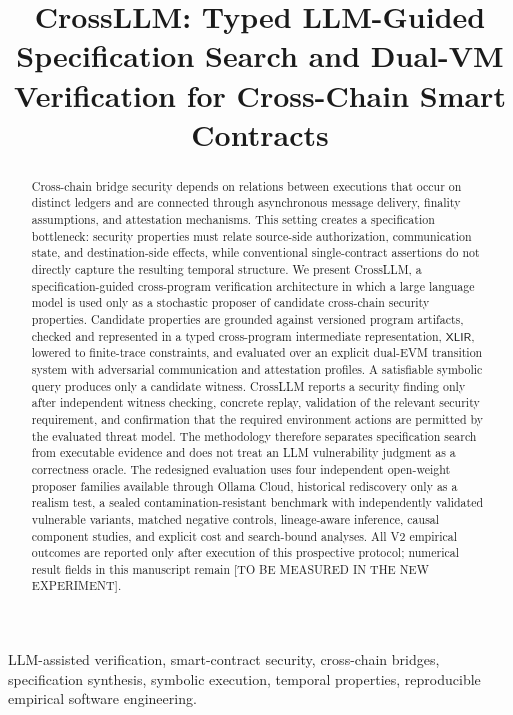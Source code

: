 \documentclass[journal]{IEEEtran}
\title{CrossLLM: Typed LLM-Guided Specification Search and Dual-VM Verification for Cross-Chain Smart Contracts}
\theoremstyle{definition}
\newcommand{\xlir}{\ensuremath{\mathsf{XLIR}}}
\newcommand{\CrossTBD}{\textnormal{[TO BE MEASURED IN THE NEW EXPERIMENT]}}
\begin{document}
\maketitle

\begin{abstract}
Cross-chain bridge security depends on relations between executions that occur on distinct ledgers and are connected through asynchronous message delivery, finality assumptions, and attestation mechanisms. This setting creates a specification bottleneck: security properties must relate source-side authorization, communication state, and destination-side effects, while conventional single-contract assertions do not directly capture the resulting temporal structure. We present CrossLLM, a specification-guided cross-program verification architecture in which a large language model is used only as a stochastic proposer of candidate cross-chain security properties. Candidate properties are grounded against versioned program artifacts, checked and represented in a typed cross-program intermediate representation, \xlir, lowered to finite-trace constraints, and evaluated over an explicit dual-EVM transition system with adversarial communication and attestation profiles. A satisfiable symbolic query produces only a candidate witness. CrossLLM reports a security finding only after independent witness checking, concrete replay, validation of the relevant security requirement, and confirmation that the required environment actions are permitted by the evaluated threat model. The methodology therefore separates specification search from executable evidence and does not treat an LLM vulnerability judgment as a correctness oracle. The redesigned evaluation uses four independent open-weight proposer families available through Ollama Cloud, historical rediscovery only as a realism test, a sealed contamination-resistant benchmark with independently validated vulnerable variants, matched negative controls, lineage-aware inference, causal component studies, and explicit cost and search-bound analyses. All V2 empirical outcomes are reported only after execution of this prospective protocol; numerical result fields in this manuscript remain \CrossTBD.
\end{abstract}

\begin{IEEEkeywords}
LLM-assisted verification, smart-contract security, cross-chain bridges, specification synthesis, symbolic execution, temporal properties, reproducible empirical software engineering.
\end{IEEEkeywords}
\end{document}
